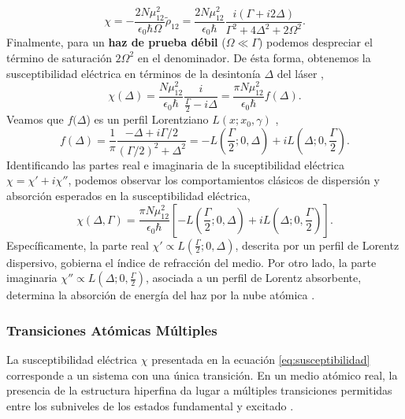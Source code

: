 \begin{equation*}
    \chi = -\frac{2 N \mu_{12}^2}{\epsilon_0 \hbar \Omega} \tilde{\rho}_{12} = \frac{2 N \mu_{12}^2}{\epsilon_0 \hbar} \frac{i (\Gamma + i 2 \Delta)}{\Gamma^2 + 4 \Delta^2 + 2 \Omega^2}.
\end{equation*}
Finalmente, para un \textbf{haz de prueba débil} ($\Omega \ll \Gamma$) podemos despreciar el término de saturación $2 \Omega^2$ en el denominador. De ésta forma, obtenemos la susceptibilidad eléctrica en términos de la desintonía $\Delta$ del láser \cite{robertw.boydNonlinearOptics},
\begin{equation}
    \chi(\Delta) = \frac{N \mu_{12}^2}{\epsilon_0 \hbar} \frac{i}{\frac{\Gamma}{2} - i\Delta} = \frac{\pi N \mu_{12}^2}{\epsilon_0 \hbar} f(\Delta).
\end{equation}
Veamos que $f(\Delta$) es un perfil Lorentziano $L(x; x_0, \gamma)$ \cite{demtroderLaserSpectroscopy1996, footAtomicPhysics2005},
\begin{equation*}
    f(\Delta)  = \frac{1}{\pi} \frac{-\Delta + i \Gamma/2}{(\Gamma/2)^2 + \Delta^2} = -L\left(\frac{\Gamma}{2}; 0, \Delta\right) + i L\left(\Delta; 0, \frac{\Gamma}{2}\right).
\end{equation*}
Identificando las partes real e imaginaria de la suceptibilidad eléctrica $\chi = \chi' + i \chi''$, podemos observar los comportamientos clásicos de dispersión y absorción esperados en la susceptibilidad eléctrica,
\begin{equation}
\boxed{
    \chi(\Delta, \Gamma) = \frac{\pi N \mu_{12}^2}{\epsilon_0 \hbar} \left[-L\left(\frac{\Gamma}{2}; 0, \Delta\right) + i L\left(\Delta; 0, \frac{\Gamma}{2}\right) \right].
}
\label{eq:susceptibilidad}
\end{equation}
Específicamente, la parte real $\chi' \propto L\left(\frac{\Gamma}{2}; 0, \Delta\right)$, descrita por un perfil de Lorentz dispersivo, gobierna el índice de refracción del medio. Por otro lado, la parte imaginaria $\chi'' \propto L\left(\Delta; 0, \frac{\Gamma}{2}\right)$, asociada a un perfil de Lorentz absorbente, determina la absorción de energía del haz por la nube atómica \cite{siddonsAbsoluteAbsorptionRubidium2008, zentileElecSusProgramCalculate2015, pizzeyLaserSpectroscopyHot2022}.
\subsubsection*{Transiciones Atómicas Múltiples}
La susceptibilidad eléctrica $\chi$ presentada en la ecuación \ref{eq:susceptibilidad} corresponde a un sistema con una única transición. En un medio atómico real, la presencia de la estructura hiperfina da lugar a múltiples transiciones permitidas entre los subniveles de los estados fundamental y excitado \cite{footAtomicPhysics2005}.

